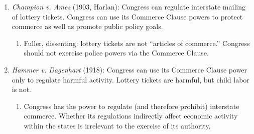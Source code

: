 \begin{enumerate}
\begin{enumerate}
\begin{enumerate}
            (presumably, laissez faire and social Darwinism). ``[A] 
            constitution is not intended to embody a particular economic 
            theory~.~.~.~''\footnote{Casebook p. 422.}
            \item ``I think that the word liberty in the Fourteenth Amendment 
            is perverted when it is held to prevent the natural outcome of a 
            dominant opinion [as expressed through the legislature], unless it 
            can be said that a rational and fair man necessarily would admit 
            that the statute proposed would infringe fundamental 
            principles~.~.~.~''\footnote{Casebook p. 422.}
        \end{enumerate}
        \item \textbf{Lochnerism}: the Court strikes down regulation as 
        infringing on economic liberty, endorsing laissez-faire economics and 
        limiting states' power to enact social welfare legislation.
        \item Problems with Lochnerism:
        \begin{enumerate}
            \item Is the freedom to contract a fundamental right?
            \item The \emph{Lochner}-era Court was inconsistent---e.g., 
            upholding regulations for coal miners but not for bakers.
            \item The Court substituted its own values for those of 
            legislatures.
        \end{enumerate}
    \end{enumerate}
    \item \emph{Champion v. Ames} (1903, Harlan): Congress can regulate interstate 
    mailing of lottery tickets. Congress can use its Commerce Clause powers to 
    protect commerce as well as promote public policy goals.
    \begin{enumerate}
        \item Fuller, dissenting: lottery tickets are not ``articles of 
        commerce.'' Congress should not exercise police powers via the 
        Commerce Clause.
    \end{enumerate}
    \item \emph{Hammer v. Dagenhart} (1918): Congress can use its Commerce 
    Clause power only to regulate harmful activity. Lottery tickets are 
    harmful, but child labor is not.
    \begin{enumerate}
        \item Congress has the power to regulate (and therefore prohibit) 
        interstate commerce. Whether its regulations indirectly affect 
        economic activity within the states is irrelevant to the exercise of 
        its authority.
    \end{enumerate}
\end{enumerate}

